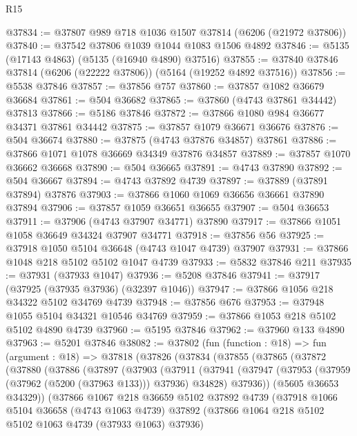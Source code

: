 \begin{lexlean}{R15}
\begin{coremodule}
{{{{{{{{{{{@37834 := @37807 @989 @718 @1036 @1507 @37814 (@6206 (@21972 @37806))
@37840 := @37542 @37806 @1039 @1044 @1083 @1506 @4892
@37846 := @5135 (@17143 @4863) (@5135 (@16940 @4890) @37516)
@37855 := @37840 @37846 @37814 (@6206 (@22222 @37806)) (@5164 (@19252 @4892 @37516))
@37856 := @5538 @37846
@37857 := @37856 @757
@37860 := @37857 @1082 @36679 @36684
@37861 := @504 @36682
@37865 := @37860 (@4743 @37861 @34442) @37813
@37866 := @5186 @37846
@37872 := @37866 @1080 @984 @36677 @34371 @37861 @34442
@37875 := @37857 @1079 @36671 @36676
@37876 := @504 @36674
@37880 := @37875 (@4743 @37876 @34857) @37861
@37886 := @37866 @1071 @1078 @36669 @34349 @37876 @34857
@37889 := @37857 @1070 @36662 @36668
@37890 := @504 @36665
@37891 := @4743 @37890
@37892 := @504 @36667
@37894 := @4743 @37892 @4739
@37897 := @37889 (@37891 @37894) @37876
@37903 := @37866 @1060 @1069 @36656 @36661 @37890 @37894
@37906 := @37857 @1059 @36651 @36655
@37907 := @504 @36653
@37911 := @37906 (@4743 @37907 @34771) @37890
@37917 := @37866 @1051 @1058 @36649 @34324 @37907 @34771
@37918 := @37856 @56
@37925 := @37918 @1050 @5104 @36648 (@4743 @1047 @4739) @37907
@37931 := @37866 @1048 @218 @5102 @5102 @1047 @4739
@37933 := @5832 @37846 @211
@37935 := @37931 (@37933 @1047)
@37936 := @5208 @37846
@37941 := @37917 (@37925 (@37935 @37936) (@32397 @1046))
@37947 := @37866 @1056 @218 @34322 @5102 @34769 @4739
@37948 := @37856 @676
@37953 := @37948 @1055 @5104 @34321 @10546 @34769
@37959 := @37866 @1053 @218 @5102 @5102 @4890 @4739
@37960 := @5195 @37846
@37962 := @37960 @133 @4890
@37963 := @5201 @37846
@38082 := @37802
    (fun (function : @18) =>
    fun (argument : @18) =>
    @37818
      (@37826
        (@37834
          (@37855
            (@37865
              (@37872
                (@37880
                  (@37886
                    (@37897
                      (@37903
                        (@37911
                          (@37941
                            (@37947
                              (@37953 (@37959 (@37962 (@5200 (@37963 @133))) @37936) @34828)
                              @37936))
                          (@5605 @36653 @34329))
                        (@37866
                          @1067
                          @218
                          @36659
                          @5102
                          @37892
                          @4739
                          (@37918
                            @1066
                            @5104
                            @36658
                            (@4743 @1063 @4739)
                            @37892
                            (@37866 @1064 @218 @5102 @5102 @1063 @4739 (@37933 @1063) @37936)
}}}}}}}}}}}
\end{coremodule}
\end{lexlean}
